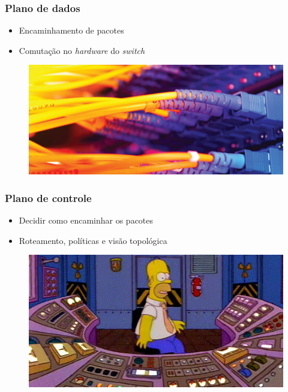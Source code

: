 %
%
\begin{frame}\frametitle{Plano de dados}

    \begin{itemize}
    \item Encaminhamento de pacotes
    \item Comutação no \emph{hardware} do \emph{switch}
    \end{itemize}
        \begin{figure}[h]
        \centering
        \includegraphics[scale=2.0]{images/data-plane.png}
    \end{figure}
\end{frame}


%
%
\begin{frame}\frametitle{Plano de controle}

    \begin{itemize}
    \item Decidir como encaminhar os pacotes
    \item Roteamento, políticas e visão topológica
    \end{itemize}
        \begin{figure}[h]
        \centering
        \includegraphics[scale=0.5]{images/control-plane.png}
    \end{figure}
\end{frame}




